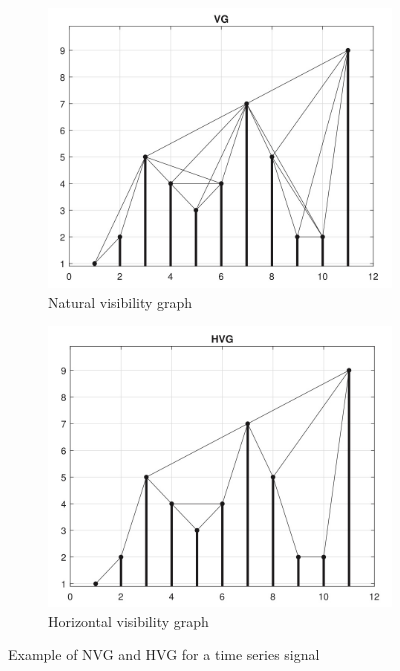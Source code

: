 \documentclass[conference]{IEEEtran}
\begin{document}
\begin{figure}[tbh]
    \centering
    \begin{subfigure}{0.45\textwidth}
        \centering
        \includegraphics[width=\linewidth]{NVG.jpg}
        \caption{Natural visibility graph}
        \label{fig:NVG_example}
    \end{subfigure}
    \hfill
    \begin{subfigure}{0.45\textwidth}
        \centering
        \includegraphics[width=\linewidth]{HVG.jpg}
        \caption{Horizontal visibility graph}
        \label{fig:HVG_example}
    \end{subfigure}
    \caption{Example of NVG and HVG for a time series signal \cite{china_HVG}}
    \label{fig:VG_example}
\end{figure}
\end{document}
